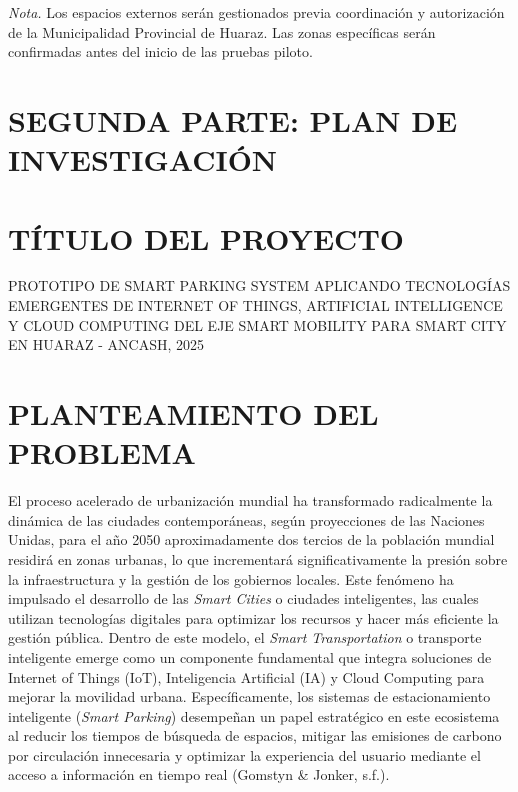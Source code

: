 \documentclass[12pt,a4paper]{article}
\newcommand{\tituloTesis}{PROTOTIPO DE SMART PARKING SYSTEM APLICANDO TECNOLOGÍAS EMERGENTES DE INTERNET OF THINGS, ARTIFICIAL INTELLIGENCE Y CLOUD COMPUTING DEL EJE SMART MOBILITY PARA SMART CITY EN HUARAZ - ANCASH, 2025}
\begin{document}
\vspace{-0.3cm}

\noindent\parbox{\textwidth}{
	\setlength{\parindent}{0pt}
	\small
	\textit{Nota.} Los espacios externos serán gestionados previa coordinación y autorización de la Municipalidad Provincial de Huaraz. Las zonas específicas serán confirmadas antes del inicio de las pruebas piloto.
}

\newpage
\clearpage
{}
\setcounter{page}{1}

\renewcommand{\thepage}{\padzeroes[2]{\decimal{page}}}

\renewcommand{\thesection}{\Roman{section}}  %
\renewcommand{\thesubsection}{\arabic{section}.\arabic{subsection}}  %
\renewcommand{\thesubsubsection}{\arabic{section}.\arabic{subsection}.\arabic{subsubsection}}  %

\section*{SEGUNDA PARTE: PLAN DE INVESTIGACIÓN}

\section{TÍTULO DEL PROYECTO}
\tituloTesis

\section{PLANTEAMIENTO DEL PROBLEMA}

El proceso acelerado de urbanización mundial ha transformado radicalmente la dinámica de las ciudades contemporáneas, según proyecciones de las Naciones Unidas, para el año 2050 aproximadamente dos tercios de la población mundial residirá en zonas urbanas, lo que incrementará significativamente la presión sobre la infraestructura y la gestión de los gobiernos locales. Este fenómeno ha impulsado el desarrollo de las \textit{Smart Cities} o ciudades inteligentes, las cuales utilizan tecnologías digitales para optimizar los recursos y hacer más eficiente la gestión pública. Dentro de este modelo, el \textit{Smart Transportation} o transporte inteligente emerge como un componente fundamental que integra soluciones de Internet of Things (IoT), Inteligencia Artificial (IA) y Cloud Computing para mejorar la movilidad urbana. Específicamente, los sistemas de estacionamiento inteligente (\textit{Smart Parking}) desempeñan un papel estratégico en este ecosistema al reducir los tiempos de búsqueda de espacios, mitigar las emisiones de carbono por circulación innecesaria y optimizar la experiencia del usuario mediante el acceso a información en tiempo real (Gomstyn \& Jonker, s.f.).
\end{document}
